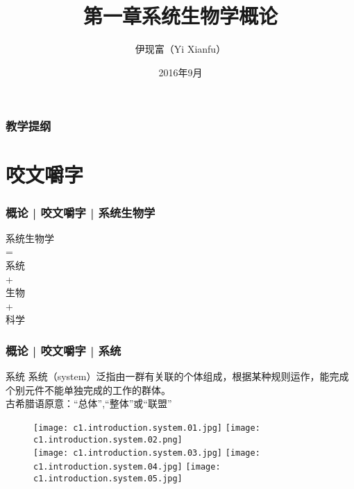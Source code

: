 



\title[概论]{第一章\quad 系统生物学概论}
\author[Yixf]{伊现富（Yi Xianfu）}
\date{2016年9月}

%

\begin{frame}[label=current]
  \titlepage
\end{frame}

\begin{frame}[plain,label=current]
  \frametitle{教学提纲}
  \setcounter{tocdepth}{3}
  \begin{multicols}{2}
    \tableofcontents
  \end{multicols}
\end{frame}


\section{咬文嚼字}
\begin{frame}
  \frametitle{概论 | 咬文嚼字 | 系统生物学}
  \begin{huge}
  \begin{center}
  系统生物学 \\ = \\ 系统 \\ + \\ 生物 \\ + \\ 科学   
\end{center}
  \end{huge}
\end{frame}

\begin{frame}
  \frametitle{概论 | 咬文嚼字 | 系统}
  \begin{block}{系统}
    系统（system）泛指由一群有关联的个体组成，根据某种规则运作，能完成个别元件不能单独完成的工作的群体。\\
    古希腊语原意：“总体”,“整体”或“联盟”
  \end{block}
  \pause
  \begin{figure}
    \centering
    \texttt{[image: c1.introduction.system.01.jpg]}\qquad
    \texttt{[image: c1.introduction.system.02.png]}\\
    \texttt{[image: c1.introduction.system.03.jpg]}\quad
    \texttt{[image: c1.introduction.system.04.jpg]}\quad
    \texttt{[image: c1.introduction.system.05.jpg]}
  \end{figure}
\end{frame}

